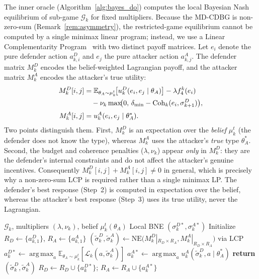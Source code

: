 \documentclass[conference]{IEEEtran}
\newcommand{\E}{\mathbb{E}}
\newcommand{\argmax}{\operatorname*{arg\,max}}
\newcommand{\Coh}{\mathrm{Coh}}
\begin{document}
The inner oracle (Algorithm~\ref{alg:bayes_do}) computes the local Bayesian Nash
equilibrium of sub-game $\mathcal{G}_k$ for fixed multipliers. Because the
MD-CDBG is non-zero-sum (Remark~\ref{rem:asymmetry}), the restricted-game
equilibrium cannot be computed by a single minimax linear program; instead, we
use a Linear Complementarity Program~\cite{lemke1964} with two distinct payoff
matrices. Let $e_i$ denote the pure defender action $a_{k,i}^D$ and $e_j$ the
pure attacker action $a_{k,j}^A$. The defender matrix $M_k^D$ encodes the
belief-weighted Lagrangian payoff, and the attacker matrix $M_k^A$ encodes the
attacker's true utility:
\begin{align}
M_k^D[i,j] &= \E_{\theta_A\sim\mu_k^t}\!\bigl[u_k^D(e_i,e_j\mid\theta_A)\bigr]
- \lambda f_4^k(e_i) \notag\\
&\quad - \nu_k\max\!\bigl(0,\,\delta_{\min}-\Coh_k(e_i,\sigma_{k+1}^D)\bigr),
\label{eq:MD}\\[2pt]
M_k^A[i,j] &= u_k^A(e_i,e_j\mid\theta_A^*).
\label{eq:MA}
\end{align}
Two points distinguish them. First, $M_k^D$ is an expectation over the
\emph{belief} $\mu_k^t$ (the defender does not know the type), whereas $M_k^A$
uses the attacker's \emph{true} type $\theta_A^*$. Second, the budget and
coherence penalties ($\lambda,\nu_k$) appear \emph{only} in $M_k^D$: they are
the defender's internal constraints and do not affect the attacker's genuine
incentives. Consequently $M_k^D[i,j]+M_k^A[i,j]\neq 0$ in general, which is
precisely why a non-zero-sum LCP is required rather than a single minimax LP.
The defender's best response (Step~2) is computed in expectation over the
belief, whereas the attacker's best response (Step~3) uses its true utility,
never the Lagrangian.

\begin{algorithm}[t]
\caption{Bayes-DO: Bayesian Double Oracle for $\mathcal{G}_k$}
\label{alg:bayes_do}
\begin{algorithmic}[1]
\REQUIRE $\mathcal{G}_k$, multipliers $(\lambda,\nu_k)$, belief
$\mu_k^t(\theta_A)$
\ENSURE Local BNE $(\sigma_k^{D*},\sigma_k^{A*})$
\STATE Initialize $R_D\gets\{a_{k,1}^D\}$, $R_A\gets\{a_{k,1}^A\}$
\REPEAT
\STATE $(\tilde\sigma_k^D,\tilde\sigma_k^A)\gets\mathrm{NE}\big(M_k^D|_{R_D
\times R_A}, M_k^A|_{R_D\times R_A}\big)$ via LCP
\STATE $a_k^{D*}\gets\argmax_a \E_{\theta_A\sim\mu_k^t}
[\mathcal{L}_k(a,\tilde\sigma_k^A)]$
\STATE $a_k^{A*}\gets\argmax_a u_k^A(\tilde\sigma_k^D,a\mid\theta_A^*)$
\STATE \textbf{return} $(\tilde\sigma_k^D,\tilde\sigma_k^A)$
\ELSE
\STATE $R_D\gets R_D\cup\{a_k^{D*}\}$;\;\; $R_A\gets R_A\cup\{a_k^{A*}\}$
\ENDIF
{}
\end{algorithmic}
\end{algorithm}
\end{document}
